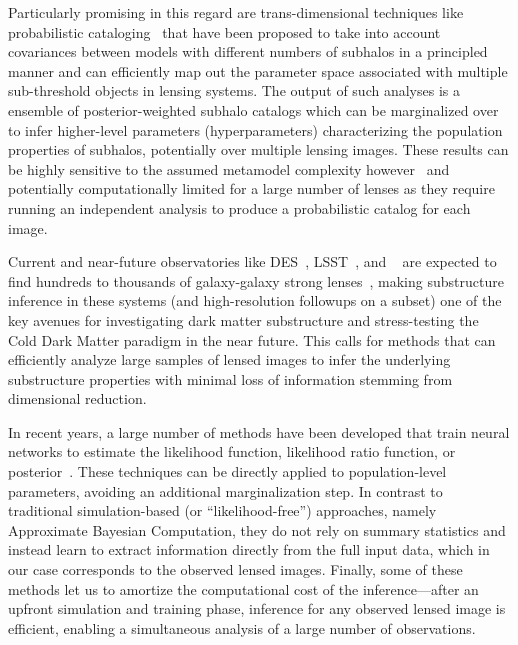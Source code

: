 \documentclass[twocolumn]{aastex63}
\begin{document}
Particularly promising in this regard are trans-dimensional techniques like probabilistic cataloging~\citep{1508.00662,1706.06111} that have been proposed to take into account covariances between models with different numbers of subhalos in a principled manner and can efficiently map out the parameter space associated with multiple sub-threshold objects in lensing systems. The output of such analyses is a ensemble of posterior-weighted subhalo catalogs which can be marginalized over to infer higher-level parameters (hyperparameters) characterizing the population properties of subhalos, potentially over multiple lensing images. These results can be highly sensitive to the assumed metamodel complexity however~\citep{1706.06111} and potentially computationally limited for a large number of lenses as they require running an independent analysis to produce a probabilistic catalog for each image.

Current and near-future observatories like DES~\citep{1601.00329}, LSST~\citep{0912.0201,2019arXiv190201055D,1902.05141}, and \Euclid~\citep{1001.0061} are expected to find hundreds to thousands of galaxy-galaxy strong lenses~\citep{1001.2037,1003.5567,2015ApJ...811...20C}, making substructure inference in these systems (and high-resolution followups on a subset) one of the key avenues for investigating dark matter substructure and stress-testing the Cold Dark Matter paradigm in the near future. This calls for methods that can efficiently analyze large samples of lensed images to infer the underlying substructure properties with minimal loss of information stemming from dimensional reduction.

In recent years, a large number of methods have been developed that train neural networks to estimate the likelihood function, likelihood ratio function, or posterior~\citep{2012arXiv1212.1479F, 2014arXiv1410.8516D, 2015arXiv150203509G, 2015arXiv150505770J, Cranmer:2015bka,  2016arXiv160508803D, 2016arXiv160206701P, NIPS2016_6084, 2016arXiv161110242D, 2016arXiv160502226U,  2016arXiv160605328V, 2016arXiv160903499V, 2016arXiv160106759V, 2017arXiv170208896T, 2017arXiv170507057P, 2017arXiv170707113L, 2017arXiv171101861L, gutmann2017likelihood, DBLP:journals/corr/abs-1806-07366, 2018arXiv181009899D, 2018arXiv181001367G, 2018arXiv180400779H, 2018arXiv180703039K, 2018arXiv180509294L, 2018arXiv180507226P, Alsing:2019xrx, Hermans:2019ioj}. These techniques can be directly applied to population-level parameters, avoiding an additional marginalization step. In contrast to traditional simulation-based (or ``likelihood-free'') approaches, namely Approximate Bayesian Computation, they do not rely on summary statistics and instead learn to extract information directly from the full input data, which in our case corresponds to the observed lensed images. Finally, some of these methods let us to amortize the computational cost of the inference---after an upfront simulation and training phase, inference for any observed lensed image is efficient, enabling a simultaneous analysis of a large number of observations.
\end{document}
